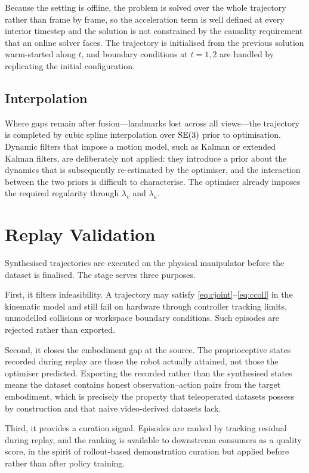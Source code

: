 Because the setting is offline, the problem is solved over the whole trajectory
rather than frame by frame, so the acceleration term is well defined at every
interior timestep and the solution is not constrained by the causality
requirement that an online solver faces. The trajectory is initialised from the
previous solution warm-started along $t$, and boundary conditions at $t=1,2$
are handled by replicating the initial configuration.

\subsection{Interpolation}

Where gaps remain after fusion---landmarks lost across all views---the
trajectory is completed by cubic spline interpolation over $\mathrm{SE}(3)$ prior to
optimisation. Dynamic filters that impose a motion model, such as Kalman or
extended Kalman filters, are deliberately not applied: they introduce a prior
about the dynamics that is subsequently re-estimated by the optimiser, and the
interaction between the two priors is difficult to characterise. The optimiser
already imposes the required regularity through
$\lambda_v$ and $\lambda_a$.

\section{Replay Validation}
\label{sec:replay}

Synthesised trajectories are executed on the physical manipulator before the
dataset is finalised. The stage serves three purposes.

First, it filters infeasibility. A trajectory may satisfy
\eqref{eq:cjoint}--\eqref{eq:ccoll} in the kinematic model and still fail on
hardware through controller tracking limits, unmodelled collisions or workspace
boundary conditions. Such episodes are rejected rather than exported.

Second, it closes the embodiment gap at the source. The proprioceptive states
recorded during replay are those the robot actually attained, not those the
optimiser predicted. Exporting the recorded rather than the synthesised states
means the dataset contains honest observation--action pairs from the target
embodiment, which is precisely the property that teleoperated datasets possess
by construction and that naive video-derived datasets lack.

Third, it provides a curation signal. Episodes are ranked by tracking residual
during replay, and the ranking is available to downstream consumers as a
quality score, in the spirit of rollout-based demonstration curation
\cite{demoscore} but applied before rather than after policy training.

